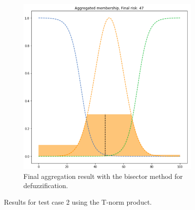 \documentclass[conference]{IEEEtran}
\begin{document}
\begin{figure}[ht]
\begin{subfigure}{.5\textwidth}
  \centering
  \includegraphics[width=.8\linewidth]{figures/second/prod-bisector.png}  
  \caption{Final aggregation result with the bisector method for defuzzification.}
  \label{fig:2prod-bisector}
\end{subfigure}
\caption{Results for test case 2 using the T-norm product.}
\label{fig:testcase2prod}
\end{figure}
\end{document}
